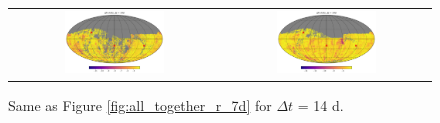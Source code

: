 \documentclass[preprintm,linenumbers]{aastex631}
\begin{document}
\begin{figure}
\begin{tabular}{c c}
         \includegraphics[width=0.5\textwidth]{results/skymaps_cutout/skymaps_cutout_delta_first_year_one_snap_v4_0_10yrs_db_noDD_noTwi_tscale-14_nside-256_doAllTemplateMetrics_reduceCount_g_noDD_noTwi.pdf} &
         \includegraphics[width=0.5\textwidth]{results/skymaps_cutout/skymaps_cutout_delta_first_year_one_snap_v4_0_10yrs_db_noDD_noTwi_tscale-14_nside-256_doAllTemplateMetrics_reduceCount_r_noDD_noTwi.pdf} \\

   \end{tabular}

        \caption{
        Same as Figure \ref{fig:all_together_r_7d} for $\Delta t$ = 14 d. 
        }
        \label{fig:all_together_r_14d}
	\end{figure}

  
\end{document}
